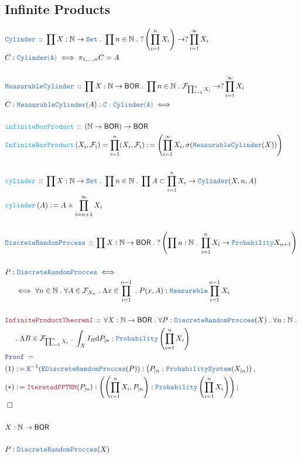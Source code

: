 \documentclass[12pt]{scrartcl}
\newcommand{\TYPE}[1]{\textcolor{NavyBlue}{\mathtt{#1}}}
\newcommand{\FUNC}[1]{\textcolor{Cerulean}{\mathtt{#1}}}
\newcommand{\LOGIC}[1]{\textcolor{Blue}{\mathtt{#1}}}
\newcommand{\THM}[1]{\textcolor{Maroon}{\mathtt{#1}}}
\renewcommand{\.}{\; . \;}
\newcommand{\de}{: \kern 0.1pc =}
\newcommand{\Act}[1]{\left( #1 \right)}
\newcommand{\Theorem}[2]{& \THM{#1} \, :: \, #2 \\ & \Proof = \\ }
\newcommand{\DeclareType}[2]{& \TYPE{#1} \, :: \, #2 \\}
\newcommand{\DefineType}[3]{& #1 : \TYPE{#2} \iff #3 \\}
\newcommand{\DeclareFunc}[2]{& \FUNC{#1} \, :: \, #2 \\}
\newcommand{\DefineFunc}[3]{&  \FUNC{#1}\Act{#2} \de #3 \\}
\newcommand{\DefineNamedFunc}[4]{&  \FUNC{#1}\Act{#2} = #3 \de #4 \\}
\newcommand{\NewLine}{\\ & \kern 1pc}
\newcommand{\Page}[1]{ \begin{align*} #1 \end{align*}   }
\newcommand{\ForEach}[3]{\forall #1 : #2 \. #3 }
\newcommand{\Nat}{\mathbb{N} }
\newcommand{\Set}{\TYPE{Set}}
\newcommand{\Say}[3]{& #1 \de #2 : #3, \\}
\newcommand{\Conclude}[3]{& #1 \de #2 : #3; \\}
\newcommand{\ByDef}{\LOGIC{E}}
\newcommand{\QED}{\; \square}
\newcommand{\EndProof}{& \QED \\}
\newcommand{\Proof}{\LOGIC{Proof} \; }
\newcommand{\BOR}{\mathsf{BOR}}
\newcommand{\DRP}{\TYPE{DiscreteRandomProcces}}
\newcommand{\F}{\mathcal{F}}
\begin{document}
\subsection{Infinite Products}
\Page{
\DeclareType{Cylinder}{ \prod X : \Nat \to \Set \. \prod n \in \Nat \. 
?\left(\prod^n_{i=1} X_{i}\right) \to ?\prod^\infty_{i=1}  X_i }
\DefineType{ C }{ \TYPE{Cylinder}(A) }{ \pi_{1,\ldots,n} C = A }
\\ 
\DeclareType{MeasurableCylinder}{ \prod X : \Nat \to \BOR \.\prod n \in \Nat \.  \F_{\prod^n_{i=1}X_i} \to ?\prod^\infty_{i=1} X_i }
\DefineType{ C : \TYPE{MeasurableCylinder}(A) }{  C : \TYPE{Cylinder}(A) }
\\ 
\DeclareFunc{infiniteBorProduct}{ (\Nat \to \BOR) \to \BOR }
\DefineNamedFunc{InfiniteBorProduct}{X_i, \F_i}{\prod^n_{i=1} (X_i,\F_i)}{ \left( \prod^\infty_{i = 1} X_i, \sigma( \TYPE{MeasurableCylinder}(X) ) \right)}
\\ 
\DeclareFunc{cylinder}{ \prod X : \Nat \to \Set \. \prod n \in \Nat \.  \prod A \subset \prod^n_{i = 1} X_i \to  \TYPE{Cylinder}(X,n,A) }
\DefineFunc{cylinder}{ A  }{ A \times \prod^\infty_{i = n + 1} X_i }
\\ 
\DeclareType{DiscreteRandomProcess}{ \prod  X :  \Nat \to \BOR \. ?\left( \prod n : \Nat \.    \prod^n_{i = 1} X_i \to 
\TYPE{Probability}  X_{n + 1}  \right)  } \\
\DefineType{ P} { \DRP }
{ \NewLine \iff \forall n \in \Nat \.  \forall A \in \F_{ X_n } \. 
 \Lambda x \in \prod^{ n - 1}_{i = 1} \.  P(x,A) : \TYPE{Measureble} \prod^{n - 1}_{i = 1 }X_i }
\\
\Theorem{InfiniteProductTheoremI}{ 
\ForEach{ X}{ \Nat \to \BOR }{ 
\ForEach{P}{\DRP(X)}{
\ForEach{n}{\Nat}{  \NewLine \.
\Lambda B \in \F_{ \prod^n_{i=1} X_i  } \.  \int_{X} I_{B} \mathrm{d}P_{|n} : \TYPE{Probability}\left( \prod^n_{i = 1 } X_i \right) 
} } } }
\Say{(1)}{\ByDef^{-1}( \ByDef \DRP  (P) )}{ \left( P_{|n} : \TYPE{ProbabilitySystem}( X_{|n}) \right)}
\Conclude{(*)}{\THM{IteretadPPTHM}( P_{|n} ) }{ \left( \left( \prod^n_{i = 1} X_i, P_{|n}  \right)  : \TYPE{Probability}\left(  \prod^n_{i = 1} X_i   \right) \right) } 
\EndProof
\\
& X : \Nat \to \BOR 
\\ \\
& P : \DRP(X) 
}
\newpage
\end{document}
